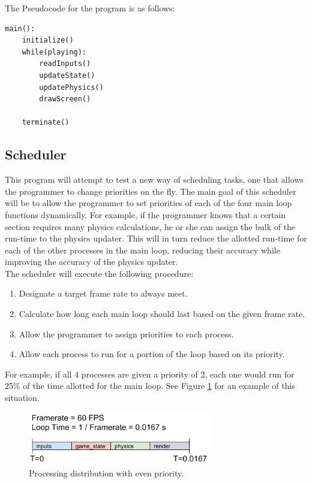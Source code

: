 \documentclass[a4paper, 12pt]{article}
\begin{document}
        The Pseudocode for the program is as follows:

\begin{lstlisting}
main():
    initialize()
    while(playing):
        readInputs()
        updateState()
        updatePhysics()
        drawScreen()

    terminate()
\end{lstlisting}

    \subsection{Scheduler}

        This program will attempt to test a new way of scheduling tasks, one that allows the programmer to change priorities on the fly. The main goal of this scheduler will be to allow the programmer to set priorities of each of the four main loop functions dynamically. For example, if the programmer knows that a certain section requires many physics calculations, he or she can assign the bulk of the run-time to the physics updater. This will in turn reduce the allotted run-time for each of the other processes in the main loop, reducing their accuracy while improving the accuracy of the physics updater.
        \\

        The scheduler will execute the following procedure:
        \begin{enumerate}
            \item{Designate a target frame rate to always meet.}
            \item{Calculate how long each main loop should last based on the given frame rate.}
            \item{Allow the programmer to assign priorities to each process.}
            \item{Allow each process to run for a portion of the loop based on its priority.}
        \end{enumerate}

        For example, if all 4 processes are given a priority of 2, each one would run for 25\% of the time allotted for the main loop. See Figure \ref{even_priority} for an example of this situation. 
        
        \begin{figure}[H]
            \includegraphics[width=8cm]{even_priority.png}
            \centering
            \caption{Processing distribution with even priority.}
            \label{even_priority}
        \end{figure}
\end{document}
